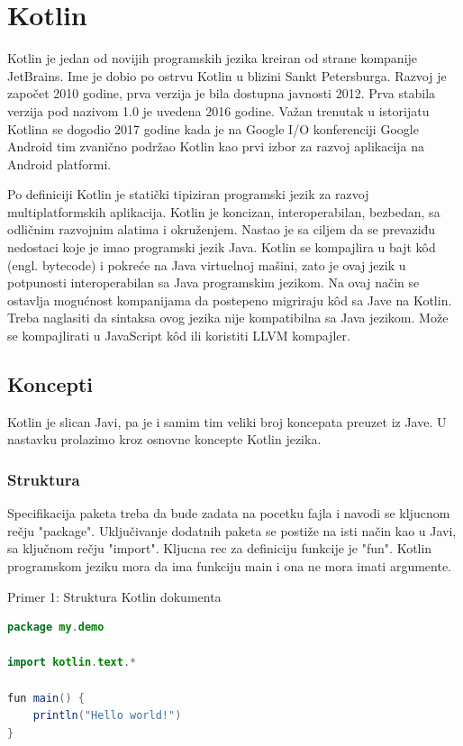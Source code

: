 \documentclass[12pt,oneside]{memoir}
\begin{document}
\section{Kotlin}
Kotlin je jedan od novijih programskih jezika kreiran od strane kompanije JetBrains. Ime je dobio po ostrvu Kotlin u blizini Sankt Petersburga. Razvoj je započet 2010 godine, prva verzija je bila dostupna javnosti 2012. Prva stabila verzija pod nazivom 1.0 je uvedena 2016 godine. Važan trenutak u istorijatu Kotlina se dogodio 2017 godine kada je na Google I/O konferenciji Google Android tim zvanično podržao Kotlin kao prvi izbor za razvoj aplikacija na Android platformi. 
 
 
Po definiciji Kotlin je statički tipiziran programski jezik za razvoj multiplatformskih aplikacija. Kotlin je koncizan, interoperabilan, bezbedan, sa odličnim razvojnim alatima i okruženjem. Nastao je sa ciljem da se prevaziđu nedostaci koje je imao programski jezik Java. Kotlin se kompajlira u bajt kôd (engl. bytecode) i pokreće na Java virtuelnoj mašini, zato je ovaj jezik u potpunosti interoperabilan sa Java programskim jezikom. Na ovaj način se ostavlja mogućnost kompanijama da postepeno migriraju kôd sa Jave na Kotlin. Treba naglasiti da sintaksa ovog jezika nije kompatibilna sa Java jezikom. Može se kompajlirati u JavaScript kôd ili koristiti LLVM kompajler.

 
\subsection{Koncepti}
Kotlin je slican Javi, pa je i samim tim veliki broj koncepata preuzet iz Jave. U nastavku prolazimo kroz osnovne koncepte Kotlin jezika. 
\subsubsection{Struktura}
Specifikacija paketa treba da bude zadata na pocetku fajla i navodi se kljucnom rečju "package". Uključivanje dodatnih paketa se postiže na isti način kao u Javi, sa ključnom rečju "import". Kljucna rec za definiciju funkcije je "fun". Kotlin programskom jeziku mora da ima funkciju main i ona ne mora imati argumente. 
 
\begin{center} Primer 1: Struktura Kotlin dokumenta\end{center}
\begin{lstlisting}[language=Java]
package my.demo
 
import kotlin.text.*
 
fun main() {
    println("Hello world!")
}
\end{lstlisting}
 
\end{document}
